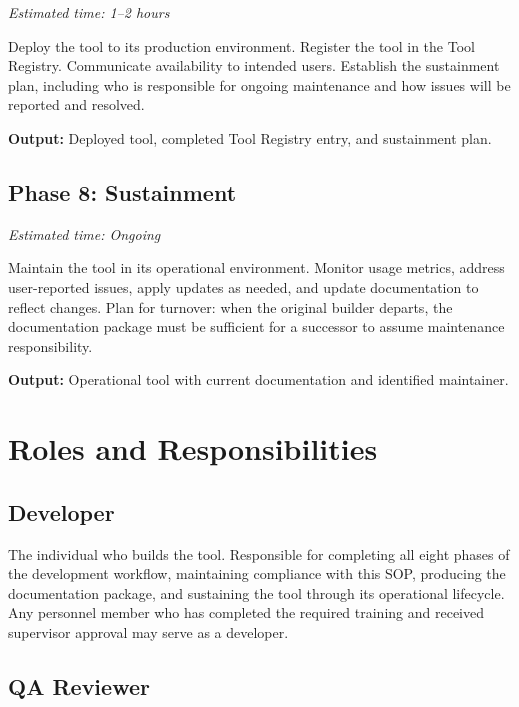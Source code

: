 \documentclass[11pt,letterpaper]{article}
\begin{document}
\noindent\textit{Estimated time: 1--2 hours}

Deploy the tool to its production environment. Register the tool in the Tool
Registry. Communicate availability to intended users. Establish the sustainment
plan, including who is responsible for ongoing maintenance and how issues will
be reported and resolved.

\textbf{Output:} Deployed tool, completed Tool Registry entry, and sustainment plan.

\subsection{Phase 8: Sustainment}
\label{sec:phase-8}

\noindent\textit{Estimated time: Ongoing}

Maintain the tool in its operational environment. Monitor usage metrics, address
user-reported issues, apply updates as needed, and update documentation to reflect
changes. Plan for turnover: when the original builder departs, the documentation
package must be sufficient for a successor to assume maintenance responsibility.

\textbf{Output:} Operational tool with current documentation and identified maintainer.

\section{Roles and Responsibilities}
\label{sec:roles-and-responsibilities}

\subsection{Developer}
\label{sec:role-developer}

The individual who builds the tool. Responsible for completing all eight phases of the
development workflow, maintaining compliance with this SOP, producing the documentation
package, and sustaining the tool through its operational lifecycle. Any personnel member
who has completed the required training and received supervisor approval may serve as a
developer.

\subsection{QA Reviewer}
\label{sec:role-qa-reviewer}
\end{document}
